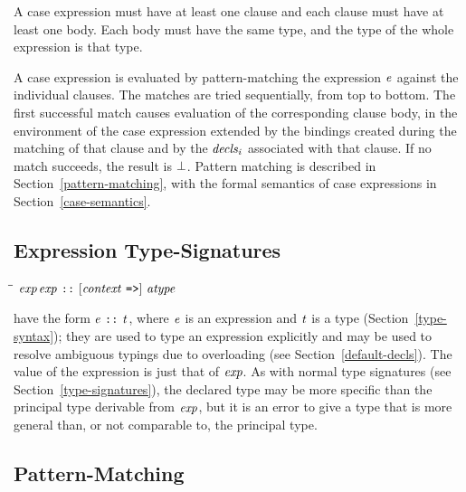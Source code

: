 A case expression must have at least one clause and each clause must
have at least one body.  Each body must have the same type, and the
type of the whole expression is that type.

A case expression is evaluated by pattern-matching the expression \mbox{$\it e$}
against the individual clauses.  The matches are tried sequentially,
from top to bottom.  The first successful match causes evaluation of
the corresponding clause body, in the environment of the case
expression extended by the bindings created during the matching of
that clause and by the \mbox{$\it decls_i$} associated with that clause.  If no
match succeeds, the result is \mbox{$\it \bot$}.  Pattern matching is described
in Section~\ref{pattern-matching}, with the formal semantics of case
expressions in Section~\ref{case-semantics}.

\subsection{Expression Type-Signatures}
\label{expression-type-sigs}
%
\begin{flushleft}\it\begin{tabbing}
\hspace{0.5in}\=\hspace{3.0in}\=\kill
$\it exp$\>\makebox[3.5em]{$\rightarrow$}$\it exp\ \makebox{\tt ::}\ [context\ \makebox{\tt =>}]\ atype$
\end{tabbing}\end{flushleft}
\indextt{::}
 have the form \mbox{$\it e\ \makebox{\tt ::}\ t$}, where \mbox{$\it e$}
is an expression and \mbox{$\it t$} is a type (Section~\ref{type-syntax}); they
are used to type an expression explicitly
and may be used to resolve ambiguous typings due to overloading (see
Section~\ref{default-decls}).  The value of the expression is just that of
\mbox{$\it exp$}.  As with normal type signatures (see
Section~\ref{type-signatures}), the declared type may be more specific than 
the principal type derivable from \mbox{$\it exp$}, but it is an error to give
a type that is more general than, or not comparable to, the
principal type.


\subsection{Pattern-Matching}
\label{pattern-matching}
\label{patterns}

